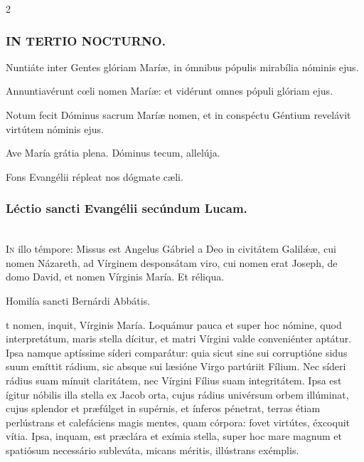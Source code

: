 \documentclass[9pt,twoside]{extarticle}
\begin{document}
\begin{multicols}{2}
\subsubsection*{\center \textsc{IN TERTIO NOCTURNO.}}
\begin{tightlist}{}
\item {} Nuntiáte inter Gentes glóriam Maríæ, in ómnibus pópulis mirabília nóminis ejus.
\item {} Annuntiavérunt cœli nomen Maríæ: et vidérunt omnes pópuli glóriam ejus.
\item {} Notum fecit Dóminus sacrum Maríæ nomen, et in conspéctu Géntium revelávit virtútem nóminis ejus.
\item {} Ave María grátia plena.  Dóminus tecum, allelúja.
\item {\small {} Fons Evangélii répleat nos dógmate cæli.}
\end{tightlist}

\subsubsection*{\center Léctio sancti Evangélii secúndum Lucam.}
\\
\lettrine{I}n illo témpore: Missus est Angelus Gábriel a Deo in civitátem Galilǽæ, cui nomen Názareth, ad Vírginem desponsátam viro, cui nomen erat Joseph, de domo David, et nomen Vírginis María. Et réliqua.

\begin{center}Homilía sancti Bernárdi Abbátis.\\
\end{center}
t nomen, inquit, Vírginis María. Loquámur pauca et super hoc nómine, quod interpretátum, maris stella dícitur, et matri Vírgini valde conveniénter aptátur. Ipsa namque aptíssime síderi comparátur: quia sicut sine sui corruptióne sidus suum emíttit rádium, sic absque sui læsióne Virgo partúriit Fílium. Nec síderi rádius suam mínuit claritátem, nec Vírgini Fílius suam integritátem. Ipsa est ígitur nóbilis illa stella ex Jacob orta, cujus rádius univérsum orbem illúminat, cujus splendor et præfúlget in supérnis, et ínferos pénetrat, terras étiam perlústrans et calefáciens magis mentes, quam córpora: fovet virtútes, éxcoquit vítia. Ipsa, inquam, est præclára et exímia stella, super hoc mare magnum et spatiósum necessário subleváta, micans méritis, illústrans exémplis.


\end{multicols}
\end{document}
